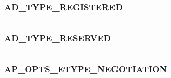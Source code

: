 \documentclass[letterpaper,10pt,english]{sphinxmanual}
\begin{document}
\subsubsection{AD\_TYPE\_REGISTERED}
\label{appdev/refs/macros/AD_TYPE_REGISTERED:ad-type-registered-data}\label{appdev/refs/macros/AD_TYPE_REGISTERED:ad-type-registered}\label{appdev/refs/macros/AD_TYPE_REGISTERED::doc}

\begin{fulllineitems}
\label{appdev/refs/macros/AD_TYPE_REGISTERED:AD_TYPE_REGISTERED}
\end{fulllineitems}


\begin{tabulary}{\linewidth}{|L|L|}
\hline

 & 
\\
\hline\end{tabulary}



\subsubsection{AD\_TYPE\_RESERVED}
\label{appdev/refs/macros/AD_TYPE_RESERVED::doc}\label{appdev/refs/macros/AD_TYPE_RESERVED:ad-type-reserved}\label{appdev/refs/macros/AD_TYPE_RESERVED:ad-type-reserved-data}

\begin{fulllineitems}
\label{appdev/refs/macros/AD_TYPE_RESERVED:AD_TYPE_RESERVED}
\end{fulllineitems}


\begin{tabulary}{\linewidth}{|L|L|}
\hline

 & 
\\
\hline\end{tabulary}



\subsubsection{AP\_OPTS\_ETYPE\_NEGOTIATION}
\label{appdev/refs/macros/AP_OPTS_ETYPE_NEGOTIATION::doc}\label{appdev/refs/macros/AP_OPTS_ETYPE_NEGOTIATION:ap-opts-etype-negotiation}\label{appdev/refs/macros/AP_OPTS_ETYPE_NEGOTIATION:ap-opts-etype-negotiation-data}
\end{document}
